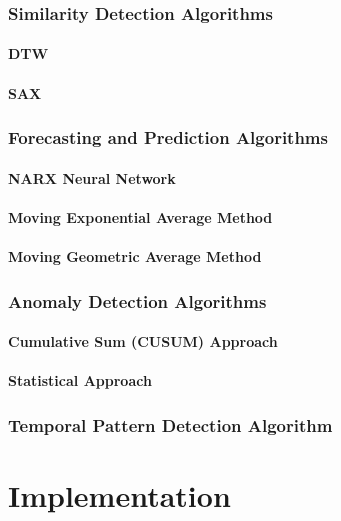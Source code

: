 \documentclass[12pt,a4paper]{report}
\begin{document}
\subsection{Similarity Detection Algorithms}
\subsubsection{DTW}
\subsubsection{SAX}
\subsection{Forecasting and Prediction Algorithms}
\subsubsection{NARX Neural Network}
\subsubsection{Moving Exponential Average Method}
\subsubsection{Moving Geometric Average Method}
\subsection{Anomaly Detection Algorithms}
\subsubsection{Cumulative Sum (CUSUM) Approach}
\subsubsection{Statistical Approach}
\subsection{Temporal Pattern Detection Algorithm}


\chapter{Implementation}
\pagestyle{fancy}
\chead{}
\rfoot{\small{\thepage}}
\renewcommand{\headrulewidth}{0.4pt}
\renewcommand{\footrulewidth}{0.4pt}
\end{document}
